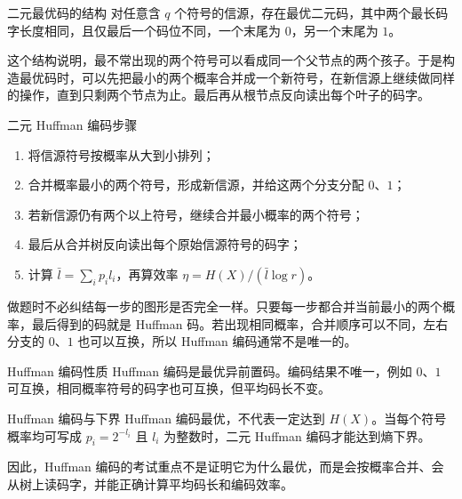 \begin{theoremBox}{二元最优码的结构}
对任意含 $q$ 个符号的信源，存在最优二元码，其中两个最长码字长度相同，且仅最后一个码位不同，一个末尾为 $0$，另一个末尾为 $1$。
\end{theoremBox}

这个结构说明，最不常出现的两个符号可以看成同一个父节点的两个孩子。于是构造最优码时，可以先把最小的两个概率合并成一个新符号，在新信源上继续做同样的操作，直到只剩两个节点为止。最后再从根节点反向读出每个叶子的码字。

\begin{methodBox}{二元 Huffman 编码步骤}
\begin{enumerate}
  \item 将信源符号按概率从大到小排列；
  \item 合并概率最小的两个符号，形成新信源，并给这两个分支分配 $0$、$1$；
  \item 若新信源仍有两个以上符号，继续合并最小概率的两个符号；
  \item 最后从合并树反向读出每个原始信源符号的码字；
  \item 计算 $\bar l=\sum_i p_i l_i$，再算效率 $\eta=H(X)/(\bar l\log r)$。
\end{enumerate}
\end{methodBox}

做题时不必纠结每一步的图形是否完全一样。只要每一步都合并当前最小的两个概率，最后得到的码就是 Huffman 码。若出现相同概率，合并顺序可以不同，左右分支的 $0$、$1$ 也可以互换，所以 Huffman 编码通常不是唯一的。

\begin{keypoint}{Huffman 编码性质}
Huffman 编码是最优异前置码。编码结果不唯一，例如 $0$、$1$ 可互换，相同概率符号的码字也可互换，但平均码长不变。
\end{keypoint}

\begin{warningBox}{Huffman 编码与下界}
Huffman 编码最优，不代表一定达到 $H(X)$。当每个符号概率均可写成 $p_i=2^{-l_i}$ 且 $l_i$ 为整数时，二元 Huffman 编码才能达到熵下界。
\end{warningBox}

因此，Huffman 编码的考试重点不是证明它为什么最优，而是会按概率合并、会从树上读码字，并能正确计算平均码长和编码效率。

